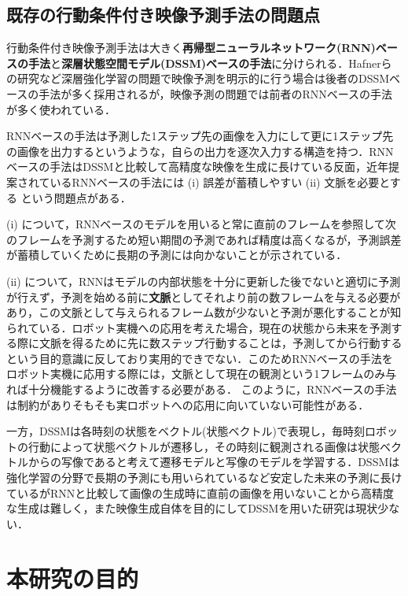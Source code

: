 \subsection{既存の行動条件付き映像予測手法の問題点}

行動条件付き映像予測手法は大きく{\bf 再帰型ニューラルネットワーク(RNN)ベースの手法}と{\bf 深層状態空間モデル(DSSM)ベースの手法}に分けられる．Hafnerら\cite{hafner2019planet}の研究など深層強化学習の問題で映像予測を明示的に行う場合は後者のDSSMベースの手法が多く採用されるが，映像予測の問題では前者のRNNベースの手法が多く使われている\cite{denton2018stochastic}\cite{villegas2019high}．

RNNベースの手法は予測した1ステップ先の画像を入力にして更に1ステップ先の画像を出力するというような，自らの出力を逐次入力する構造を持つ．RNNベースの手法はDSSMと比較して高精度な映像を生成に長けている反面，近年提案されているRNNベースの手法には (i) 誤差が蓄積しやすい (ii) 文脈を必要とする という問題点がある．

(i) について，RNNベースのモデルを用いると常に直前のフレームを参照して次のフレームを予測するため短い期間の予測であれば精度は高くなるが，予測誤差が蓄積していくために長期の予測には向かないことが示されている\cite{hafner2019planet}．

(ii) について，RNNはモデルの内部状態を十分に更新した後でないと適切に予測が行えず，予測を始める前に{\bf 文脈}としてそれより前の数フレームを与える必要があり，この文脈として与えられるフレーム数が少ないと予測が悪化することが知られている\cite{villegas2019high}．ロボット実機への応用を考えた場合，現在の状態から未来を予測する際に文脈を得るために先に数ステップ行動することは，予測してから行動するという目的意識に反しており実用的できでない．このためRNNベースの手法をロボット実機に応用する際には，文脈として現在の観測という1フレームのみ与れば十分機能するように改善する必要がある．
このように，RNNベースの手法は制約がありそもそも実ロボットへの応用に向いていない可能性がある．

一方，DSSMは各時刻の状態をベクトル(状態ベクトル)で表現し，毎時刻ロボットの行動によって状態ベクトルが遷移し，その時刻に観測される画像は状態ベクトルからの写像であると考えて遷移モデルと写像のモデルを学習する．DSSMは強化学習の分野で長期の予測にも用いられているなど安定した未来の予測に長けているがRNNと比較して画像の生成時に直前の画像を用いないことから高精度な生成は難しく，また映像生成自体を目的にしてDSSMを用いた研究は現状少ない．

\section{本研究の目的}

